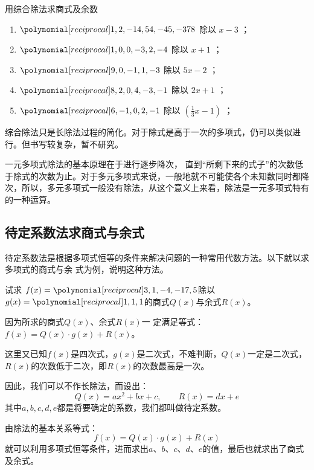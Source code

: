 \begin{ex}
    用综合除法求商式及余数
\begin{enumerate}
    \item  $\poly{1,2,-14,54,-45,-378}$   除以   $x-3$  ；
    \item   $\poly{1,0,0,-3,2,-4}$  除以   $x+1$  ；
    \item   $\poly{9,0,-1,1,-3}$  除以   $5x-2$  ；
    \item   $\poly{8,2,0,4,-3,-1}$  除以   $2x+1$  ；
    \item  $\poly{6,-1,0,2,-1}$   除以   $\left(\frac{1}{3}x-1\right)$  ；
\end{enumerate}
\end{ex}


综合除法只是长除法过程的简化。对于除式是高于一次的多项式，仍可以类似进行。但书写较复杂，暂不研究。

一元多项式除法的基本原理在于进行逐步降次，
直到“所剩下来的式子”的次数低于除式的次数为止。对于多元多项式来说，一般地就不可能使各个未知数同时都降次，所以，多元多项式一般没有除法，从这个意义上来看，除法是一元多项式特有的一种运算。


\subsection{待定系数法求商式与余式}
待定系数法是根据多项式恒等的条件来解决问题的一种常用代数方法。以下就以求多项式的商式与余
式为例，说明这种方法。

\begin{example}
    试求
    $f(x)=\poly{3,1,-4,-17,5}$除以$g(x) =\poly{1,1,1}$的商式$Q(x)$与余式$R(x)$。
\end{example}

\begin{analyze}
    因为所求的商式$Q(x)$、余式$R(x)$一
定满足等式：$f(x)=Q(x)\cdot g(x)+R(x)$。

这里又已知$f(x)$是四次式，$g(x)$是二次式，不难判断，$Q(x)$一定是二次式，$R(x)$的次数低于二次，即$R(x)$的次数最高是一次。

因此，我们可以不作长除法，而设出：
$$Q(x)=ax^2+bx+c,\qquad R(x)=dx+e$$
其中$a,b,c,d,e$都是将要确定的系数，我们都叫做待定系数。

由除法的基本关系等式：
$$f(x)=Q(x)\cdot g(x)+R(x)$$
就可以利用多项式恒等条件，进而求出$a$、$b$、$c$、$d$、$e$的值，最后也就求出了商式及余式。
\end{analyze}

